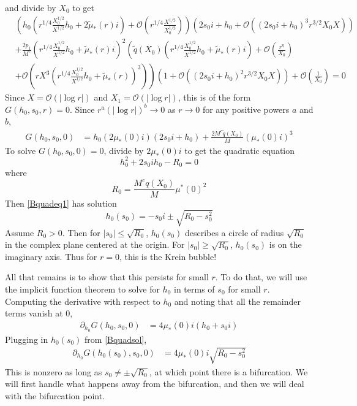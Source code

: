 \documentclass[thesis.tex]{subfiles}
\begin{document}
and divide by $X_0$ to get
\begin{equation*}
\begin{aligned}
&\left( h_0 \left( r^{1/4}\frac{X_0^{1/2}}{X^{1/2}} h_0 + 2 \tilde{\mu}_*(r) i\right) + \mathcal{O}\left( r^{1/4} \frac{X^{1/2}}{X_0^{1/2}} \right) \right) 
\left( 2 s_0 i + h_0 + \mathcal{O}\left( \left( 2 s_0 i + h_0 \right)^3 r^{3/2} X_0 X \right) \right) \\
&+\frac{2 p_1}{M^c} \left( r^{1/4}\frac{X_0^{1/2}}{X^{1/2}} h_0 + \tilde{\mu}_*(r) i\right)^2 \left( \tilde{q}(X_0) \left(r^{1/4}\frac{X_0^{1/2}}{X^{1/2}} h_0 + \tilde{\mu}_*(r)i \right) + \mathcal{O}\left(\frac{r^{\eta}}{X_0} \right) \right.\\
&+ \left. \mathcal{O} \left (r X^3 \left(r^{1/4} \frac{X_0^{1/2}}{X^{1/2}} h_0 + \tilde{\mu}_*(r)\right)^3 \right) \right) \left( 1 + \mathcal{O}\left( \left(2 s_0 i + h_0\right)^2 r^{3/2} X_0 X \right) \right) + \mathcal{O}\left(\frac{1}{X_0}\right) = 0
\end{aligned}
\end{equation*}
Since $X = \mathcal{O}(|\log r|)$ and $X_1 = \mathcal{O}(|\log r|)$, this is of the form $G(h_0, s_0, r) = 0$. Since $r^{a}(|\log r|)^b \rightarrow 0$ as $r \rightarrow 0$ for any positive powers $a$ and $b$, 
\begin{equation}\label{BsimpleG0}
\begin{aligned}
G(h_0, s_0, 0) &= h_0 (2 \mu_*(0) i)(2 s_0 i + h_0) + \frac{2 M^c \tilde{q}(X_0)}{M}(\mu_*(0) i)^3 
\end{aligned}
\end{equation}
To solve $G(h_0, s_0, 0) = 0$, divide by $2 \mu_*(0) i$ to get the quadratic equation
\begin{equation}\label{Bquadeq1}
h_0^2 + 2 s_0 i h_0 - R_0 = 0
\end{equation}
where 
\[
R_0 = \frac{M^c q(X_0)}{M}\mu^*(0)^2
\]
Then \cref{Bquadeq1} has solution
\begin{equation}\label{Bquadsol}
h_0(s_0) = -s_0 i \pm \sqrt{ R_0 - s_0^2 }
\end{equation}
Assume $R_0 > 0$. Then for $|s_0| \leq \sqrt{R_0}$, $h_0(s_0)$ describes a circle of radius $\sqrt{R_0}$ in the complex plane centered at the origin. For $|s_0| \geq \sqrt{R_0}$, $h_0(s_0)$ is on the imaginary axis. Thus for $r = 0$, this is the Krein bubble!

All that remains is to show that this persists for small $r$. To do that, we will use the implicit function theorem to solve for $h_0$ in terms of $s_0$ for small $r$. Computing the derivative with respect to $h_0$ and noting that all the remainder terms vanish at 0,
\begin{align*}
\partial_{h_0} G(h_0, s_0, 0) 
&= 4\mu_*(0) i ( h_0 + s_0 i )
\end{align*}
Plugging in $h_0(s_0)$ from \cref{Bquadsol},
\begin{align*}
\partial_{h_0} G(h_0(s_0), s_0, 0) 
&= 4\mu_*(0) i \sqrt{ R_0 - s_0^2 }
\end{align*}
This is nonzero as long as $s_0 \neq \pm \sqrt{R_0}$, at which point there is a bifurcation. We will first handle what happens away from the bifurcation, and then we will deal with the bifurcation point.
\end{document}
